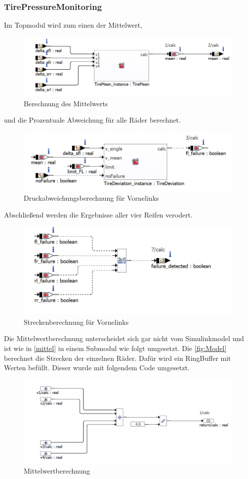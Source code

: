\subsubsection{TirePressureMonitoring}
Im Topmodul wird zum einen der Mittelwert,
\begin{figure}[H]
	\centering
	\includegraphics[width=0.7\linewidth]{../Graphiken/mean}
	\caption{Berechnung des Mittelwerts}
	\label{fig:Simittelm}
\end{figure}
und die Prozentuale Abweichung für alle Räder berechnet.
\begin{figure}[H]
	\centering
	\includegraphics[width=0.7\linewidth]{../Graphiken/deviation}
	\caption{Druckabweichungsberechnung für Vornelinks}
	\label{fig:abweichung}
\end{figure}
Abschließend werden die Ergebnisse aller vier Reifen verodert.
\begin{figure}[H]
	\centering
	\includegraphics[width=0.7\linewidth]{../Graphiken/or}
	\caption{Streckenberechnung für Vornelinks}
	\label{fig:Sim}
\end{figure}
Die Mittelwertberechnung unterscheidet sich gar nicht vom Simulinkmodel und ist wie in \autoref{mittel} in einem Submodul wie folgt umgesetzt.
Die \autoref{fig:Model} berechnet die Strecken der einzelnen Räder. Dafür wird ein RingBuffer mit Werten befüllt. Dieser wurde mit folgendem Code umgesetzt.
\begin{figure}[H]
	\centering
	\includegraphics[width=0.8\linewidth]{../Graphiken/meanCalc}
	\caption{Mittelwertberechnung}
	\label{fig:Sim}
\end{figure}
